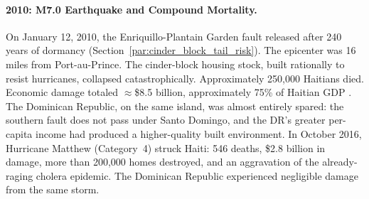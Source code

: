 \paragraph{2010: M7.0 Earthquake and Compound Mortality.}
On January 12, 2010, the Enriquillo-Plantain Garden fault released after 240 years of dormancy (Section~\ref{par:cinder_block_tail_risk}). The epicenter was 16 miles from Port-au-Prince. The cinder-block housing stock, built rationally to resist hurricanes, collapsed catastrophically. Approximately 250,000 Haitians died. Economic damage totaled $\approx$\$8.5 billion, approximately 75\% of Haitian GDP \cite{usgs_enriquillo_fault}. The Dominican Republic, on the same island, was almost entirely spared: the southern fault does not pass under Santo Domingo, and the DR's greater per-capita income had produced a higher-quality built environment. In October 2016, Hurricane Matthew (Category~4) struck Haiti: 546 deaths, \$2.8 billion in damage, more than 200,000 homes destroyed, and an aggravation of the already-raging cholera epidemic. The Dominican Republic experienced negligible damage from the same storm.

